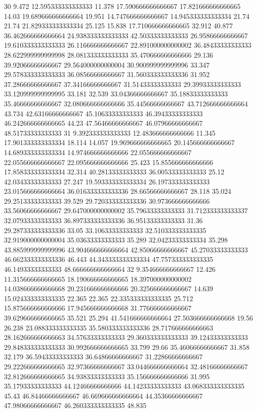 30 9.472 12.595333333333333 11.378 17.590666666666667 17.821666666666665 14.03 19.689666666666664 19.951 14.747666666666667 14.945333333333334 21.74 21.74 21.829333333333334 25.125 15.838 17.710666666666665 32.912 40.877 36.462666666666664 24.938333333333333 42.50333333333333 26.95866666666667 19.610333333333333 26.116666666666667 22.891000000000002 36.48433333333333 28.622999999999998 28.081333333333333 35.470666666666666 29.136 39.92066666666667 29.564000000000004 30.900999999999996 33.347 29.578333333333333 36.08566666666667 31.560333333333336 31.952 37.28666666666667 37.34166666666667 31.51433333333333 29.39933333333333 33.120999999999995 33.181 32.539 33.04366666666667 35.18833333333333 35.46666666666667 32.080666666666666 35.44566666666667 43.712666666666664 43.734 42.63166666666667 45.10633333333333 46.39433333333333 46.242666666666665 44.23 47.56466666666667 46.07966666666667 48.51733333333333
31 9.392333333333333 12.483666666666666 11.345 17.901333333333334 18.114 14.057 19.969666666666665 20.145666666666667 14.689333333333334 14.974666666666666 22.055666666666667 22.055666666666667 22.095666666666666 25.423 15.855666666666666 17.858333333333334 32.314 40.28133333333333 36.00533333333333 25.12 42.03433333333333 27.247 19.593333333333334 26.197333333333333 23.015666666666664 36.016333333333336 28.66566666666667 28.118 35.024 29.25133333333333 39.529 29.720333333333336 30.973666666666666 33.56066666666667 29.647000000000002 35.79633333333333 31.712333333333337 32.07933333333333 36.897333333333336 36.95133333333333 31.36 29.287333333333336 33.05 33.10633333333333 32.510333333333335 32.919000000000004 35.03633333333333 35.289 32.04233333333334 35.298 43.885999999999996 43.904666666666664 42.85066666666667 45.27033333333333 46.662333333333336 46.443 44.343333333333334 47.757333333333335 46.14933333333333 48.666666666666664
32 9.354666666666667 12.426 11.315666666666665 18.190666666666665 18.397000000000002 14.038666666666668 20.231666666666666 20.325666666666667 14.639 15.024333333333335 22.365 22.365 22.335333333333335 25.712 15.875666666666666 17.945666666666668 31.776666666666667 39.629666666666665 35.521 25.294 41.541666666666664 27.503666666666668 19.56 26.238 23.088333333333335 35.580333333333336 28.717666666666663 28.162666666666663 34.57633333333333 29.360333333333333 39.12433333333333 29.848333333333333 30.992666666666665 33.799 29.66 35.46066666666667 31.858 32.179 36.59433333333333 36.64866666666667 31.22866666666667 29.222666666666665 32.97366666666667 33.044666666666664 32.48166666666667 32.812666666666665 34.93833333333333 35.156666666666666 31.995 35.17933333333333 44.12466666666666 44.14233333333333 43.068333333333335 45.43 46.84466666666667 46.669666666666664 44.35366666666667 47.98066666666667 46.260333333333335 48.835
